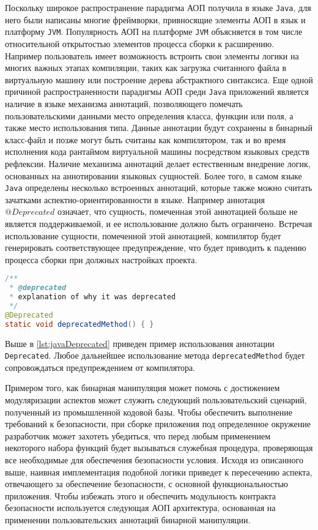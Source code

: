Поскольку широкое распространение парадигма АОП получила в языке \texttt{Java}, для него были написаны многие фреймворки, привносящие элементы АОП в язык и платформу \texttt{JVM}. Популярность АОП на платформе \texttt{JVM} объясняется в том числе относительной открытостью элементов процесса сборки к расширению. Например пользователь имеет возможность встроить свои элементы логики на многих важных этапах компиляции, таких как загрузка считанного файла в виртуальную машину или построение дерева абстрактного синтаксиса. Еще одной причиной распространенности парадигмы АОП среди \texttt{Java} приложений является наличие в языке механизма аннотаций, позволяющего помечать пользовательскими данными место определения класса, функции или поля, а также место использования типа. Данные аннотации будут сохранены в бинарный класс-файл и позже могут быть считаны как компилятором, так и во время исполнения кода рантаймом виртуальной машины посредством языковых средств рефлексии. Наличие механизма аннотаций делает естественным внедрение логик, основанных на аннотировании языковых сущностей. Более того, в самом языке \texttt{Java} определены несколько встроенных аннотаций, которые также можно считать зачатками аспектно-ориентированности в языке. Например аннотация $@Deprecated$ означает, что сущность, помеченная этой аннотацией больше не является поддерживаемой, и ее использование должно быть ограничено. Встречая использование сущности, помеченной этой аннотацией, компилятор будет генерировать соответствующее предупреждение, что будет приводить к падению процесса сборки при должных настройках проекта.

\begin{lstlisting}[language=Java, caption=Пример использования аннотации \texttt{Deprecated}, label=lst:javaDeprecated]
/**
 * @deprecated
 * explanation of why it was deprecated
 */
@Deprecated
static void deprecatedMethod() { }
\end{lstlisting}

Выше в \autoref{lst:javaDeprecated} приведен пример использования аннотации \texttt{Deprecated}. Любое дальнейшее использование метода \texttt{deprecatedMethod} будет сопровождаться предупреждением от компилятора.

Примером того, как бинарная манипуляция может помочь с достижением модуляризации аспектов может служить следующий пользовательский сценарий, полученный из промышленной кодовой базы. Чтобы обеспечить выполнение требований к безопасности, при сборке приложения под определенное окружение разработчик может захотеть убедиться, что перед любым применением некоторого набора функций будет вызываться служебная процедура, проверяющая все необходимые для обеспечения безопасности условия. Исходя из описанного выше, наивная имплементация подобной логики приведет к пересечению аспекта, отвечающего за обеспечение безопасности, с основной функциональностью приложения. Чтобы избежать этого и обеспечить модульность контракта безопасности используется следующая АОП архитектура, основанная на применении пользовательских аннотаций бинарной манипуляции.

